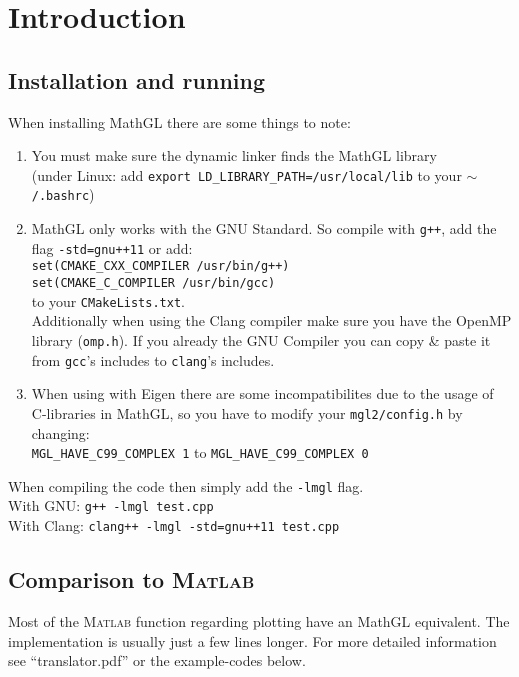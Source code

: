 \documentclass[a4paper]{article}
\begin{document}
\section{Introduction}

\subsection{Installation and running}

When installing MathGL there are some things to note:
\begin{enumerate}
  \item{You must make sure the dynamic linker finds the MathGL library \\
    (under Linux: add \texttt{export LD\_LIBRARY\_PATH=/usr/local/lib} to your \texttt{$\mathtt{\sim}$/.bashrc})}
    \item{MathGL only works with the GNU Standard. So compile with \texttt{g++}, add the flag \texttt{-std=gnu++11} or add: \\
      \texttt{set(CMAKE\_CXX\_COMPILER /usr/bin/g++) \\
              set(CMAKE\_C\_COMPILER /usr/bin/gcc)} \\
      to your \texttt{CMakeLists.txt}. \\
      Additionally when using the Clang compiler make sure you have the OpenMP library (\texttt{omp.h}). 
      If you already the GNU Compiler you can copy \& paste it from \texttt{gcc}'s includes to \texttt{clang}'s includes.}
  \item{When using with Eigen there are some incompatibilites due to the usage of C-libraries in MathGL,
      so you have to modify your \texttt{mgl2/config.h} by changing: \\
    \texttt{MGL\_HAVE\_C99\_COMPLEX 1} to \texttt{MGL\_HAVE\_C99\_COMPLEX 0}}
\end{enumerate}
When compiling the code then simply add the \texttt{-lmgl} flag. \\
With GNU: \texttt{g++ -lmgl test.cpp} \\ 
With Clang: \texttt{clang++ -lmgl -std=gnu++11 test.cpp} \\

\subsection{Comparison to \textsc{Matlab}}

Most of the \textsc{Matlab} function regarding plotting have an MathGL equivalent. 
The implementation is usually just a few lines longer.
For more detailed information see ``translator.pdf'' or the example-codes below.
\end{document}
